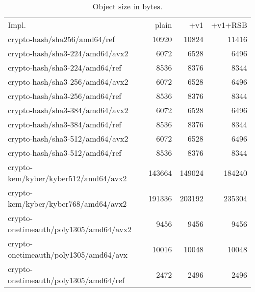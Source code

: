 

\setlength{\tabcolsep}{4pt}
\begin{table}
    \caption{Object size in bytes.}
    \label{tab:results:codesize}
  \begin{tabular}{lrrr}
  \toprule
Impl. & plain  & +v1 & +v1+RSB \\

crypto-hash/sha256/amd64/ref &
10920 &
10824 &
11416\\ 


crypto-hash/sha3-224/amd64/avx2 &
6072 &
6528 &
6496\\ 


crypto-hash/sha3-224/amd64/ref &
8536 &
8376 &
8344\\ 


crypto-hash/sha3-256/amd64/avx2 &
6072 &
6528 &
6496\\ 


crypto-hash/sha3-256/amd64/ref &
8536 &
8376 &
8344\\ 


crypto-hash/sha3-384/amd64/avx2 &
6072 &
6528 &
6496\\ 


crypto-hash/sha3-384/amd64/ref &
8536 &
8376 &
8344\\ 


crypto-hash/sha3-512/amd64/avx2 &
6072 &
6528 &
6496\\ 


crypto-hash/sha3-512/amd64/ref &
8536 &
8376 &
8344\\ 


crypto-kem/kyber/kyber512/amd64/avx2 &
143664 &
149024 &
184240\\ 


crypto-kem/kyber/kyber768/amd64/avx2 &
191336 &
203192 &
235304\\ 


crypto-onetimeauth/poly1305/amd64/avx2 &
9456 &
9456 &
9456\\ 


crypto-onetimeauth/poly1305/amd64/avx &
10016 &
10048 &
10048\\ 


crypto-onetimeauth/poly1305/amd64/ref &
2472 &
2496 &
2496\\ 



\end{tabular}
\end{table}
